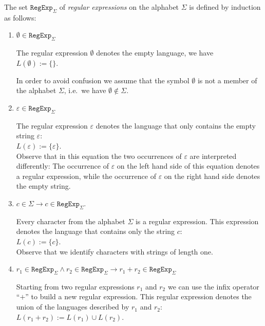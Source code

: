 \begin{Definition}
  The set $\texttt{RegExp}_\Sigma$ of \emph{regular expressions} on the alphabet  $\Sigma$ is defined
  by induction as follows:
  \begin{enumerate}
  \item $\emptyset \in \texttt{RegExp}_\Sigma$

        The regular expression $\emptyset$ denotes the empty language, we have
        \\[0.2cm]
        \hspace*{1.3cm}
        $L(\emptyset) := \{\}$.

        In order to avoid confusion we assume that the symbol $\emptyset$ is not a member of the
        alphabet $\Sigma$, i.e.~we have $\emptyset \not\in \Sigma$.
  \item $\varepsilon \in \texttt{RegExp}_\Sigma$

        The regular expression $\varepsilon$ denotes the language that only contains the empty
        string $\varepsilon$: 
        \\[0.2cm]
        \hspace*{1.3cm}
        $L(\varepsilon) := \{ \varepsilon \}$.
        \\[0.2cm]
        Observe that in this equation the two occurrences of $\varepsilon$ are interpreted differently:
        The occurrence of $\varepsilon$ on the left hand side of this equation denotes a regular
        expression, while the occurrence of $\varepsilon$ on the right hand side denotes the empty
        string.
  \item $c \in \Sigma \rightarrow c \in \texttt{RegExp}_\Sigma$.

        Every character from the alphabet $\Sigma$ is a regular expression.  This expression denotes
        the language that contains only the string $c$:
        \\[0.2cm]
        \hspace*{1.3cm}
        $L(c) := \{ c \}$.
        \\[0.2cm]
        Observe that we identify characters with strings of length one.
  \item $r_1 \in \texttt{RegExp}_\Sigma \wedge r_2 \in \texttt{RegExp}_\Sigma
         \rightarrow r_1 + r_2 \in \texttt{RegExp}_\Sigma$

        Starting from two regular expressions $r_1$ and $r_2$ we can use the  infix operator
        ``$+$'' to build a new regular expression.  This regular expression denotes the union of 
        the languages described by $r_1$ and $r_2$:
        \\[0.2cm]
        \hspace*{1.3cm}
        $L(r_1 + r_2) := L(r_1) \cup L(r_2)$.


\end{enumerate}
\end{Definition}

